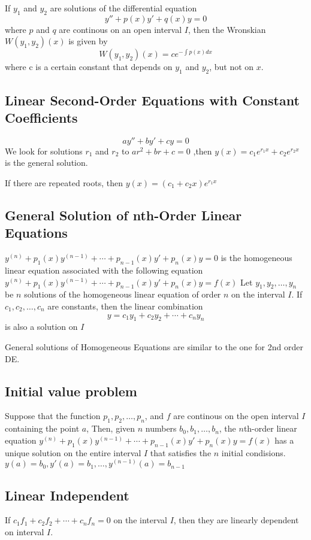 \documentclass[letter]{article}
\begin{document}
\begin{thm}
If $y_1$ and $y_2$ are solutions of the differential equation
\[
y''+p(x)y'+q(x)y = 0
\]
where $p$ and $q$ are continous on an open interval $I$, then the Wronskian $W(y_1,y_2)(x)$ is given by
\[
W(y_1,y_2)(x) = c e^{-\int{p(x)dx}}
\]
where c is a certain constant that depends on $y_1$ and $y_2$, but not on $x$.
\end{thm}

\subsection{Linear Second-Order Equations with Constant Coefficients}
\[
ay''+by'+cy=0
\]
We look for solutions $r_1$ and $r_2$ to $ar^2+br+c=0$ ,then $y(x) = c_1e^{r_1x} + c_2e^{r_2x}$ is the general solution.

If there are repeated roots, then $y(x) = (c_1+c_2x)e^{r_1x}$

\subsection{General Solution of nth-Order Linear Equations}
$y^{(n)} + p_1(x)y^{(n-1)} + \cdots + p_{n-1}(x)y' + p_n(x)y = 0$ is the homogeneous linear equation associated with the following equation $y^{(n)} + p_1(x)y^{(n-1)} + \cdots + p_{n-1}(x)y' + p_n(x)y = f(x)$
Let $y_1,y_2,\ldots,y_n$ be $n$ solutions of the homogeneous linear equation of order $n$ on the interval $I$. If $c_1, c_2, \ldots, c_n$ are constants, then the linear combination
\[
y = c_1y_1 + c_2y_2 + \cdots + c_ny_n
\]
is also a solution on $I$

General solutions of Homogeneous Equations are similar to the one for 2nd order DE.
\subsection{Initial value problem}
Suppose that the function $p_1, p_2, \ldots, p_n$, and $f$ are continous on the open interval $I$ containing the point $a$, Then, given $n$ numbers $b_0, b_1, \ldots, b_n$, the $n$th-order linear equation
 $y^{(n)} + p_1(x)y^{(n-1)} + \cdots + p_{n-1}(x)y' + p_n(x)y = f(x)$
has a unique solution on the entire interval $I$ that satisfies the $n$ initial condisions.
$y(a) = b_0, y'(a) = b_1, \ldots, y^{(n-1)}(a) = b_{n-1}$

\subsection{Linear Independent}
If $c_1f_1+c_2f_2 + \cdots + c_nf_n = 0$ on the interval $I$, then they are linearly dependent on interval $I$.
\end{document}
